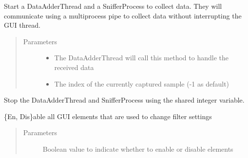 \documentclass[letterpaper,10pt,english]{sphinxmanual}
\begin{document}
\begin{fulllineitems}
\begin{fulllineitems}
\label{\detokenize{src:src.FilterTab.FilterTab.startSnifferAndAdder}}
Start a DataAdderThread and a SnifferProcess to collect data. They will communicate using a
multiprocess pipe to collect data without interrupting the GUI thread.
\begin{quote}\begin{description}
\item[{Parameters}] \leavevmode\begin{itemize}
\item {} 
 \textendash{} The DataAdderThread will call this method to handle the received data

\item {} 
 \textendash{} The index of the currently captured sample (-1 as default)

\end{itemize}

\end{description}\end{quote}

\end{fulllineitems}


\begin{fulllineitems}
\label{\detokenize{src:src.FilterTab.FilterTab.stopSnifferAndAdder}}
Stop the DataAdderThread and SnifferProcess using the shared integer variable.

\end{fulllineitems}


\begin{fulllineitems}
\label{\detokenize{src:src.FilterTab.FilterTab.toggleGUIElements}}
\{En, Dis\}able all GUI elements that are used to change filter settings
\begin{quote}\begin{description}
\item[{Parameters}] \leavevmode
{} \textendash{} Boolean value to indicate whether to enable or disable elements


\end{description}
\end{quote}
\end{fulllineitems}
\end{fulllineitems}
\end{document}
